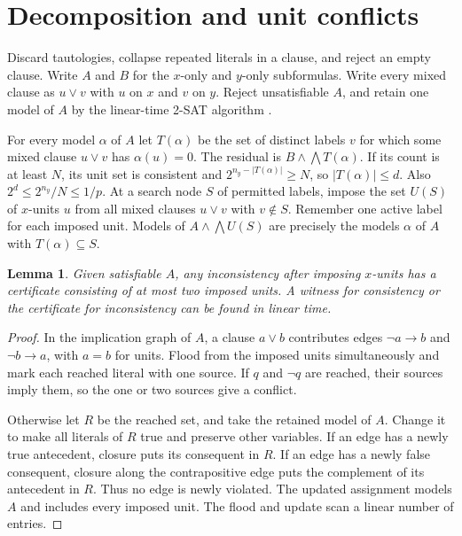 \documentclass[11pt,a4paper]{amsart}
\newtheorem{lemma}[theorem]{Lemma}
\begin{document}
\section{Decomposition and unit conflicts}
Discard tautologies, collapse repeated literals in a clause, and reject an empty clause. Write \(A\) and \(B\) for the \(x\)-only and \(y\)-only subformulas. Write every mixed clause as \(u\vee v\) with \(u\) on \(x\) and \(v\) on \(y\). Reject unsatisfiable \(A\), and retain one model of \(A\) by the linear-time 2-SAT algorithm \cite{apt}.

For every model \(\alpha\) of \(A\) let \(T(\alpha)\) be the set of distinct labels \(v\) for which some mixed clause \(u\vee v\) has \(\alpha(u)=0\). The residual is \(B\wedge\bigwedge T(\alpha)\). If its count is at least \(N\), its unit set is consistent and \(2^{n_y-|T(\alpha)|}\ge N\), so \(|T(\alpha)|\le d\). Also \(2^d\le 2^{n_y}/N\le1/p\). At a search node \(S\) of permitted labels, impose the set \(U(S)\) of \(x\)-units \(u\) from all mixed clauses \(u\vee v\) with \(v\notin S\). Remember one active label for each imposed unit. Models of \(A\wedge\bigwedge U(S)\) are precisely the models \(\alpha\) of \(A\) with \(T(\alpha)\subseteq S\).

\begin{lemma}\label{lemma:conflict}
Given satisfiable \(A\), any inconsistency after imposing \(x\)-units has a certificate consisting of at most two imposed units. A witness for consistency or the certificate for inconsistency can be found in linear time.
\end{lemma}
\begin{proof}
In the implication graph of \(A\), a clause \(a\vee b\) contributes edges \(\neg a\to b\) and \(\neg b\to a\), with \(a=b\) for units. Flood from the imposed units simultaneously and mark each reached literal with one source. If \(q\) and \(\neg q\) are reached, their sources imply them, so the one or two sources give a conflict.

Otherwise let \(R\) be the reached set, and take the retained model of \(A\). Change it to make all literals of \(R\) true and preserve other variables. If an edge has a newly true antecedent, closure puts its consequent in \(R\). If an edge has a newly false consequent, closure along the contrapositive edge puts the complement of its antecedent in \(R\). Thus no edge is newly violated. The updated assignment models \(A\) and includes every imposed unit. The flood and update scan a linear number of entries.
\end{proof}
\end{document}
